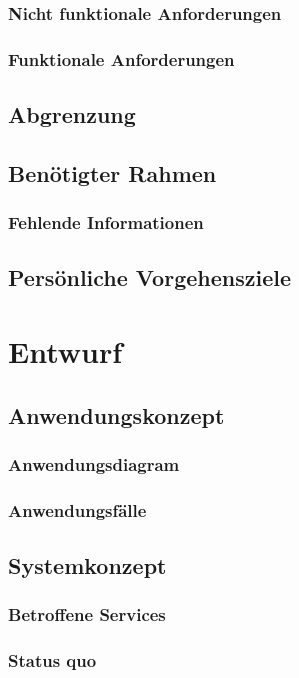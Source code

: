 \subsection{Nicht funktionale Anforderungen}
\subsection{Funktionale Anforderungen}

\section{Abgrenzung}

\section{Benötigter Rahmen}
\subsection{Fehlende Informationen}

\section{Persönliche Vorgehensziele}



\chapter{Entwurf}
\section{Anwendungskonzept}
\subsection{Anwendungsdiagram}
\subsection{Anwendungsfälle}

\section{Systemkonzept}
\subsection{Betroffene Services}
\subsection{Status quo}
